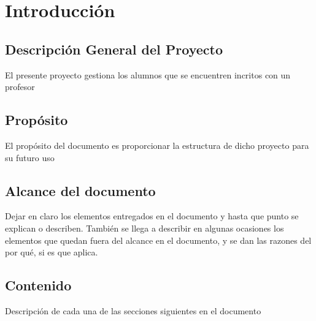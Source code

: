 \chapter{Introducción}


\section{Descripción General del Proyecto}
El presente proyecto gestiona los alumnos que se encuentren incritos con un profesor


\section{Propósito}
El propósito del documento es proporcionar la estructura de dicho proyecto para su futuro uso

\section{Alcance del documento}
Dejar en claro los elementos entregados en el documento y hasta que punto se explican o describen. También se llega a describir en algunas ocasiones los elementos que quedan fuera del alcance en el documento, y se dan las razones del por qué, si es que aplica.

\section{Contenido}
Descripción de cada una de las secciones siguientes en el documento
